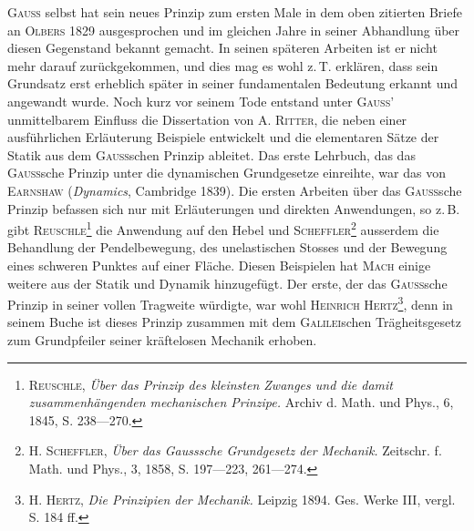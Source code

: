 \textsc{Gauss} selbst hat sein neues Prinzip zum ersten Male in dem oben zitierten
Briefe an \textsc{Olbers} 1829 ausgesprochen und im gleichen Jahre in seiner
Abhandlung über diesen Gegenstand bekannt gemacht. In seinen späteren
Arbeiten ist er nicht mehr darauf zurückgekommen, und dies mag es wohl
z.\,T. erklären, dass sein Grundsatz erst erheblich später in seiner fundamentalen
Bedeutung erkannt und angewandt wurde. Noch kurz vor seinem Tode
entstand unter \textsc{Gauss}’ unmittelbarem Einfluss die Dissertation von A. \textsc{Ritter},
die neben einer ausführlichen Erläuterung Beispiele entwickelt und die elementaren
Sätze der Statik aus dem \textsc{Gauss}schen Prinzip ableitet. Das erste
Lehrbuch, das das \textsc{Gauss}sche Prinzip unter die dynamischen Grundgesetze
einreihte, war das von \textsc{Earnshaw} (\textit{Dynamics}, Cambridge 1839). Die ersten
Arbeiten über das \textsc{Gauss}sche Prinzip befassen sich nur mit Erläuterungen
\clearpage{}
\noindent und direkten Anwendungen, so z.\,B. gibt \textsc{Reuschle}\footnote{\textsc{Reuschle}, \textit{Über das Prinzip des kleinsten Zwanges und die damit zusammenhängenden mechanischen Prinzipe.} Archiv d. Math. und Phys., 6, 1845, S. 238—270.} die Anwendung auf
den Hebel und \textsc{Scheffler}\footnote{H. \textsc{Scheffler}, \textit{Über das Gausssche Grundgesetz der Mechanik.} Zeitschr. f. Math. und Phys.,
3, 1858, S. 197—223, 261—274.} ausserdem die Behandlung der Pendelbewegung,
des unelastischen Stosses und der Bewegung eines schweren Punktes auf
einer Fläche. Diesen Beispielen hat \textsc{Mach} einige weitere aus der Statik und
Dynamik hinzugefügt. Der erste, der das \textsc{Gauss}sche Prinzip in seiner vollen
Tragweite würdigte, war wohl \textsc{Heinrich Hertz}\footnote{H. \textsc{Hertz}, \textit{Die Prinzipien der Mechanik.} Leipzig 1894. Ges. Werke III, vergl. S. 184 ff.}, denn in seinem Buche ist
dieses Prinzip zusammen mit dem \textsc{Galilei}schen Trägheitsgesetz zum Grundpfeiler
seiner kräftelosen Mechanik erhoben.

